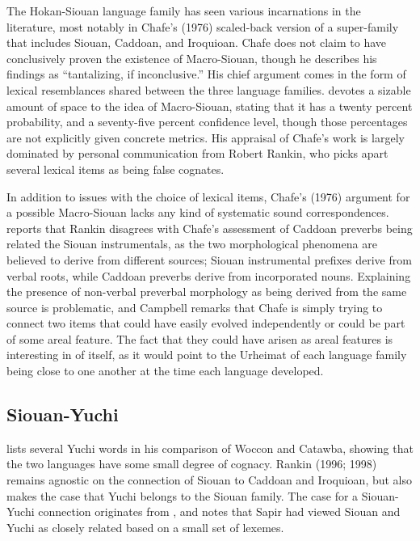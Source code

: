 \documentclass[output=paper]{LSP/langsci}
\begin{document}
The Hokan-Siouan language family has seen various incarnations in the literature, most notably in Chafe's (1976) scaled-back version of a super-family that includes Siouan, Caddoan, and Iroquioan. Chafe does not claim to have conclusively proven the existence of Macro-Siouan, though he describes his findings as ``tantalizing, if inconclusive.'' His chief argument comes in the form of lexical resemblances shared between the three language families. \citet{Campbell2000} devotes a sizable amount of space to the idea of Macro-Siouan, stating that it has a twenty percent probability, and a seventy-five percent confidence level, though those percentages are not explicitly given concrete metrics. His appraisal of Chafe's work is largely dominated by personal communication from Robert Rankin, who picks apart several lexical items as being false cognates.

In addition to issues with the choice of lexical items, Chafe's (1976) argument for a possible Macro-Siouan lacks any kind of systematic sound correspondences. \citet{Campbell2000} reports that Rankin disagrees with Chafe's assessment of Caddoan preverbs being related the Siouan instrumentals, as the two morphological phenomena are believed to derive from different sources; Siouan instrumental prefixes derive from verbal roots, while Caddoan preverbs derive from incorporated nouns. Explaining the presence of non-verbal preverbal morphology as being derived from the same source is problematic, and Campbell remarks that Chafe is simply trying to connect two items that could have easily evolved independently or could be part of some areal feature. The fact that they could have arisen as areal features is interesting in of itself, as it would point to the Urheimat of each language family being close to one another at the time each language developed.

\subsection{Siouan-Yuchi}

\citet{Carter1980} lists several Yuchi words in his comparison of Woccon and Catawba, showing that the two languages have some small degree of cognacy. Rankin (1996; 1998) remains agnostic on the connection of Siouan to Caddoan and Iroquioan, but also makes the case that Yuchi belongs to the Siouan family. The case for a Siouan-Yuchi connection originates from \citet{Sapir1929}, and \citet{Haas1952} notes that Sapir had viewed Siouan and Yuchi as closely related based on a small set of lexemes.
\end{document}
